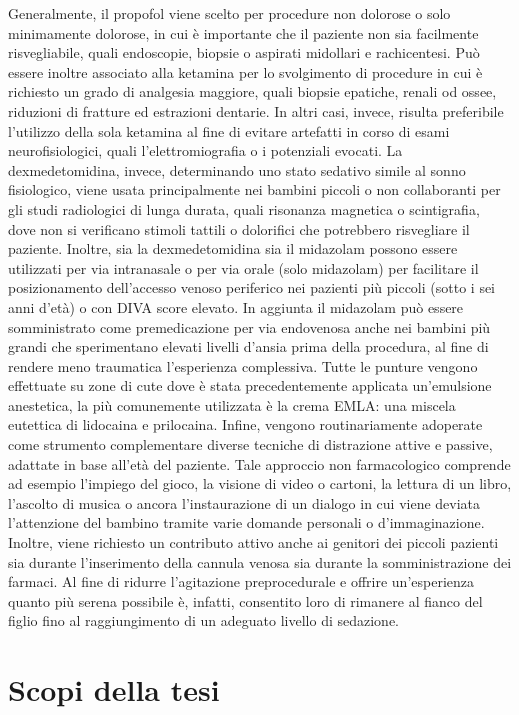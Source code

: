Generalmente, il propofol viene scelto per procedure non dolorose o solo minimamente dolorose, in cui è importante che il paziente non sia facilmente risvegliabile, quali endoscopie, biopsie o aspirati midollari e rachicentesi. Può essere inoltre associato alla ketamina per lo svolgimento di procedure in cui è richiesto un grado di analgesia maggiore, quali biopsie epatiche, renali od ossee, riduzioni di fratture ed estrazioni dentarie. In altri casi, invece, risulta preferibile l'utilizzo della sola ketamina al fine di evitare artefatti in corso di esami neurofisiologici, quali l'elettromiografia o i potenziali evocati. La dexmedetomidina, invece, determinando uno stato sedativo simile al sonno fisiologico, viene usata principalmente nei bambini piccoli o non collaboranti per gli studi radiologici di lunga durata, quali risonanza magnetica o scintigrafia, dove non si verificano stimoli tattili o dolorifici che potrebbero risvegliare il paziente. Inoltre, sia la dexmedetomidina sia il midazolam possono essere utilizzati per via intranasale o per via orale (solo midazolam) per facilitare il posizionamento dell'accesso venoso periferico nei pazienti più piccoli (sotto i sei anni d'età) o con DIVA score elevato. In aggiunta il midazolam può essere somministrato come premedicazione per via endovenosa anche nei bambini più grandi che sperimentano elevati livelli d'ansia prima della procedura, al fine di rendere meno traumatica l'esperienza complessiva. Tutte le punture vengono effettuate su zone di cute dove è stata precedentemente applicata un'emulsione anestetica, la più comunemente utilizzata è la crema EMLA: una miscela eutettica di lidocaina e prilocaina. Infine, vengono routinariamente adoperate come strumento complementare diverse tecniche di distrazione attive e passive, adattate in base all'età del paziente. Tale approccio non farmacologico comprende ad esempio l'impiego del gioco, la visione di video o cartoni, la lettura di un libro, l'ascolto di musica o ancora l'instaurazione di un dialogo in cui viene deviata l'attenzione del bambino tramite varie domande personali o d'immaginazione. Inoltre, viene richiesto un contributo attivo anche ai genitori dei piccoli pazienti sia durante l'inserimento della cannula venosa sia durante la somministrazione dei farmaci. Al fine di ridurre l'agitazione preprocedurale e offrire un'esperienza quanto più serena possibile è, infatti, consentito loro di rimanere al fianco del figlio fino al raggiungimento di un adeguato livello di sedazione. 

\section{Scopi della tesi}

